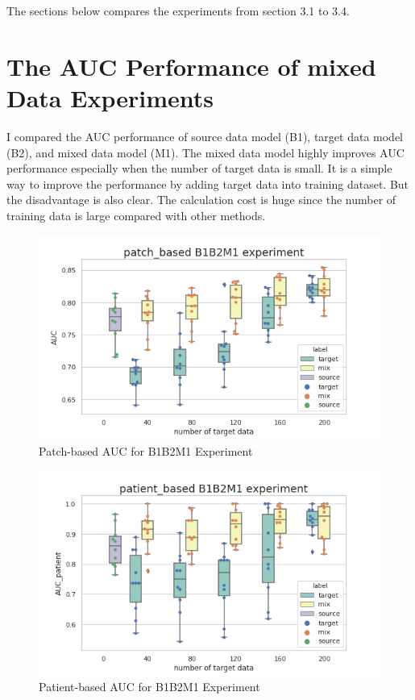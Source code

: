 The sections below compares the experiments from section 3.1 to 3.4. 

\section{The AUC Performance of mixed Data Experiments}
I compared the AUC performance of source data model (B1), target data model (B2), and mixed data model (M1). The mixed data model highly improves AUC performance especially when the number of target data is small. It is a simple way to improve the performance by adding target data into training dataset. But the disadvantage is also clear. The calculation cost is huge since the number of training data is large compared with other methods.
 \\

\begin{figure}[H]
    \hfil
    \begin{minipage}[t]{0.9\textwidth}
        \includegraphics[width=\textwidth]{fig/B1B2M1_num_patch.png}
        \caption{\label{fig:parallel1}Patch-based AUC for B1B2M1 Experiment}
    \end{minipage}
    \hfil
\end{figure}
\begin{figure}[H]
    \hfil
    \begin{minipage}[t]{0.9\textwidth}
        \includegraphics[width=\textwidth]{fig/B1B2M1_num_patient.png}
        \caption{\label{fig:parallel1}Patient-based AUC for B1B2M1 Experiment}
    \end{minipage}
    \hfil
\end{figure}

